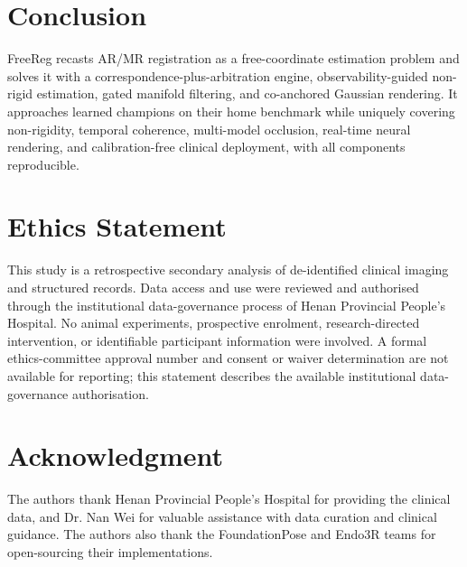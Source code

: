 \documentclass[journal]{IEEEtran}
\begin{document}
\section{Conclusion}
FreeReg recasts AR/MR registration as a free-coordinate estimation problem and solves it with a correspondence-plus-arbitration engine, observability-guided non-rigid estimation, gated manifold filtering, and co-anchored Gaussian rendering. It approaches learned champions on their home benchmark while uniquely covering non-rigidity, temporal coherence, multi-model occlusion, real-time neural rendering, and calibration-free clinical deployment, with all components reproducible.

\section*{Ethics Statement}
This study is a retrospective secondary analysis of de-identified clinical imaging and structured records. Data access and use were reviewed and authorised through the institutional data-governance process of Henan Provincial People's Hospital. No animal experiments, prospective enrolment, research-directed intervention, or identifiable participant information were involved. A formal ethics-committee approval number and consent or waiver determination are not available for reporting; this statement describes the available institutional data-governance authorisation.

\section*{Acknowledgment}
The authors thank Henan Provincial People's Hospital for providing the clinical data, and Dr. Nan Wei for valuable assistance with data curation and clinical guidance. The authors also thank the FoundationPose and Endo3R teams for open-sourcing their implementations.
\end{document}
